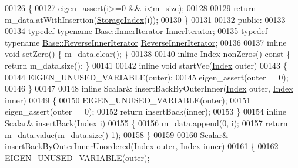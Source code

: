 \begin{DoxyCode}
00126     \{
00127       eigen\_assert(i>=0 && i<m\_size);
00128 
00129       \textcolor{keywordflow}{return} m\_data.atWithInsertion(\hyperlink{group___sparse_core___module_a0b540ba724726ebe953f8c0df06081ed}{StorageIndex}(i));
00130     \}
00131 
00132   \textcolor{keyword}{public}:
00133 
00134     \textcolor{keyword}{typedef} \textcolor{keyword}{typename} \hyperlink{class_eigen_1_1_sparse_compressed_base_1_1_inner_iterator}{Base::InnerIterator} \hyperlink{class_eigen_1_1_sparse_compressed_base_1_1_inner_iterator}{InnerIterator};
00135     \textcolor{keyword}{typedef} \textcolor{keyword}{typename} \hyperlink{class_eigen_1_1_sparse_compressed_base_1_1_reverse_inner_iterator}{Base::ReverseInnerIterator} 
      \hyperlink{class_eigen_1_1_sparse_compressed_base_1_1_reverse_inner_iterator}{ReverseInnerIterator};
00136 
00137     \textcolor{keyword}{inline} \textcolor{keywordtype}{void} setZero() \{ m\_data.clear(); \}
00138 
\hyperlink{group___sparse_core___module_aeaa74603bb1405f622726907795c9b5a}{00140}     \textcolor{keyword}{inline} \hyperlink{group___core___module_a554f30542cc2316add4b1ea0a492ff02}{Index} \hyperlink{group___sparse_core___module_aeaa74603bb1405f622726907795c9b5a}{nonZeros}()\textcolor{keyword}{ const  }\{ \textcolor{keywordflow}{return} m\_data.size(); \}
00141 
00142     \textcolor{keyword}{inline} \textcolor{keywordtype}{void} startVec(\hyperlink{group___core___module_a554f30542cc2316add4b1ea0a492ff02}{Index} outer)
00143     \{
00144       EIGEN\_UNUSED\_VARIABLE(outer);
00145       eigen\_assert(outer==0);
00146     \}
00147 
00148     \textcolor{keyword}{inline} Scalar& insertBackByOuterInner(\hyperlink{group___core___module_a554f30542cc2316add4b1ea0a492ff02}{Index} outer, \hyperlink{group___core___module_a554f30542cc2316add4b1ea0a492ff02}{Index} inner)
00149     \{
00150       EIGEN\_UNUSED\_VARIABLE(outer);
00151       eigen\_assert(outer==0);
00152       \textcolor{keywordflow}{return} insertBack(inner);
00153     \}
00154     \textcolor{keyword}{inline} Scalar& insertBack(\hyperlink{group___core___module_a554f30542cc2316add4b1ea0a492ff02}{Index} i)
00155     \{
00156       m\_data.append(0, i);
00157       \textcolor{keywordflow}{return} m\_data.value(m\_data.size()-1);
00158     \}
00159     
00160     Scalar& insertBackByOuterInnerUnordered(\hyperlink{group___core___module_a554f30542cc2316add4b1ea0a492ff02}{Index} outer, \hyperlink{group___core___module_a554f30542cc2316add4b1ea0a492ff02}{Index} inner)
00161     \{
00162       EIGEN\_UNUSED\_VARIABLE(outer);

\end{DoxyCode}
